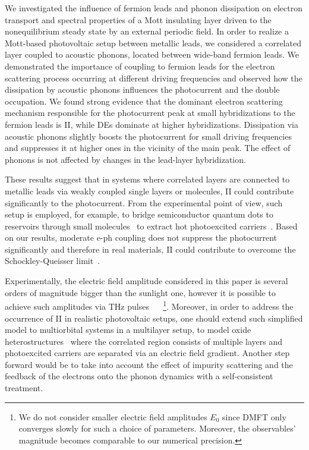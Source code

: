 \documentclass[aps,prb,groupedaddress,showpacs,twocolumn,superscriptaddress,10pt]{revtex4-2}
\begin{document}
We investigated the influence of fermion leads and phonon dissipation on electron transport and spectral properties of a Mott insulating layer driven to the nonequilibrium steady state by an external periodic field. In order to realize a Mott-based photovoltaic setup between metallic leads, we considered a correlated layer coupled to acoustic phonons, located between wide-band fermion leads. We demonstrated the importance of coupling to fermion leads for the electron scattering process occurring at different driving frequencies and observed how the dissipation by acoustic phonons influences the photocurrent and the double occupation. We found strong evidence that the dominant electron scattering mechanism responsible for the photocurrent peak at small hybridizations to the fermion leads is II, while DEs dominate at higher hybridizations. Dissipation via acoustic phonons slightly boosts the photocurrent for small driving frequencies and suppresses it at higher ones in the vicinity of the main peak. The effect of phonons is not affected by changes in the lead-layer hybridization.

These results suggest that in systems where correlated layers are connected to metallic leads via weakly coupled single layers or molecules, II could contribute significantly to the photocurrent. From the experimental point of view, such setup is employed, for example, to bridge semiconductor quantum dots to reservoirs through small molecules~\cite{wa.mc.13,wa.bo.17} to extract hot photoexcited carriers~\cite{ti.ke.10,ca.wa.16}. Based on our results, moderate e-ph coupling does not suppress the photocurrent significantly and therefore in real materials, II could contribute to overcome the Schockley-Queisser limit~\cite{sh.qu.61}.
 
Experimentally, the electric field amplitude considered in this paper is several orders of magnitude bigger than the sunlight one, however it is possible to achieve such amplitudes via THz pulses ~\cite{mu.we.18} ~\footnote{We do not consider smaller electric field amplitudes $E_0$ since DMFT only converges slowly for such a choice of parameters. Moreover, the observables' magnitude becomes comparable to our numerical precision.}. Moreover, in order to address the occurrence of II in realistic photovoltaic setups, one should extend such simplified model to multiorbital systems \cite{pe.be.19} in a multilayer setup, to model oxide heterostructures~\cite{as.bl.13,pe.be.19} where the correlated region consists of multiple layers and photoexcited carriers are separated via an electric field gradient. Another step forward would be to take into account the effect of impurity scattering and the feedback of the electrons onto the phonon dynamics with a self-consistent treatment.
 
\end{document}

